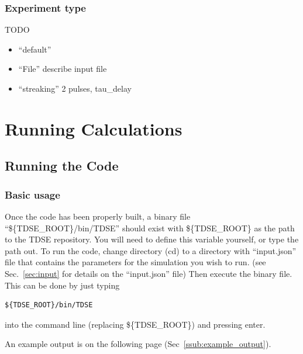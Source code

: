 \documentclass{article}
\begin{document}
\subsubsection{Experiment type} %
\label{ssub:experiment_type}
TODO
\begin{itemize}
  \item ``default''
  \item ``File'' describe input file
  \item ``streaking'' 2 pulses, tau\_delay
\end{itemize}



\section{Running Calculations} %
\label{sec:running_tdse_and_best_practices}
\subsection{Running the Code} %
\label{sub:running_the_code}
\subsubsection{Basic usage} %
\label{ssub:basic_usage}
Once the code has been properly built, a binary file ``\$\{TDSE\_ROOT\}/bin/TDSE'' should exist with \$\{TDSE\_ROOT\} as the path to the TDSE repository. You will need to define this variable yourself, or type the path out. To run the code, change directory (cd) to a directory with ``input.json'' file that contains the parameters for the simulation you wish to run. (see Sec.~\ref{sec:input} for details on the ``input.json'' file) Then execute the binary file. This can be done by just typing 
\begin{verbatim}
${TDSE_ROOT}/bin/TDSE
\end{verbatim}
into the command line (replacing \$\{TDSE\_ROOT\}) and pressing enter.

An example output is on the following page (Sec~\ref{ssub:example_output}).
\newpage
\end{document}
